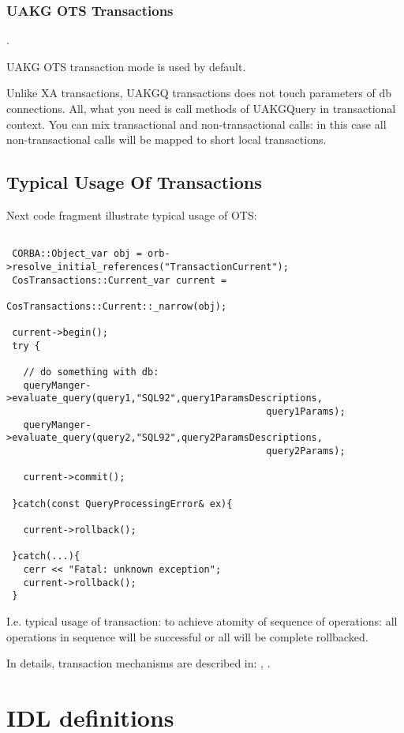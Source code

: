 \documentclass[10pt]{article}
\begin{document}
 \subsubsection{UAKG OTS Transactions}.

  UAKG OTS transaction mode is used by default.
 
 Unlike XA transactions, UAKGQ transactions does not
touch parameters of db connections. All, what you need is call methods of
UAKGQuery in transactional context. You can mix transactional and
non-transactional calls: in this case all non-transactional calls will
be mapped to short local transactions.

\subsection{Typical Usage Of Transactions}

 Next code fragment illustrate typical usage of OTS:

\begin{verbatim}

 CORBA::Object_var obj = orb->resolve_initial_references("TransactionCurrent");
 CosTransactions::Current_var current = 
                                 CosTransactions::Current::_narrow(obj);

 current->begin();
 try {

   // do something with db:
   queryManger->evaluate_query(query1,"SQL92",query1ParamsDescriptions,
                                              query1Params);
   queryManger->evaluate_query(query2,"SQL92",query2ParamsDescriptions,
                                              query2Params);

   current->commit();

 }catch(const QueryProcessingError& ex){

   current->rollback();

 }catch(...){
   cerr << "Fatal: unknown exception";
   current->rollback();
 }
\end{verbatim}

 I.e. typical usage of transaction: to achieve atomity of sequence of
operations: all operations in sequence will be successful or all will be complete rollbacked.

 In details, transaction mechanisms are described in:
 \cite{OMG-COS-OTS} ,  \cite{XOPEN-XA}.

\section{IDL definitions}
\end{document}
